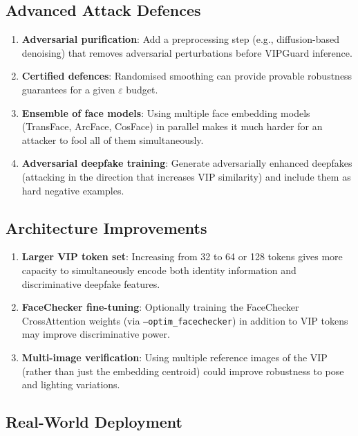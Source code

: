 \documentclass[12pt,a4paper]{article}
\begin{document}
\subsection{Advanced Attack Defences}

\begin{enumerate}
    \item \textbf{Adversarial purification}: Add a preprocessing step (e.g., diffusion-based denoising) that removes adversarial perturbations before VIPGuard inference.

    \item \textbf{Certified defences}: Randomised smoothing can provide provable robustness guarantees for a given $\varepsilon$ budget.

    \item \textbf{Ensemble of face models}: Using multiple face embedding models (TransFace, ArcFace, CosFace) in parallel makes it much harder for an attacker to fool all of them simultaneously.

    \item \textbf{Adversarial deepfake training}: Generate adversarially enhanced deepfakes (attacking in the direction that increases VIP similarity) and include them as hard negative examples.
\end{enumerate}

\subsection{Architecture Improvements}

\begin{enumerate}
    \item \textbf{Larger VIP token set}: Increasing from 32 to 64 or 128 tokens gives more capacity to simultaneously encode both identity information and discriminative deepfake features.

    \item \textbf{FaceChecker fine-tuning}: Optionally training the FaceChecker CrossAttention weights (via \texttt{--optim\_facechecker}) in addition to VIP tokens may improve discriminative power.

    \item \textbf{Multi-image verification}: Using multiple reference images of the VIP (rather than just the embedding centroid) could improve robustness to pose and lighting variations.
\end{enumerate}

\subsection{Real-World Deployment}
\end{document}
